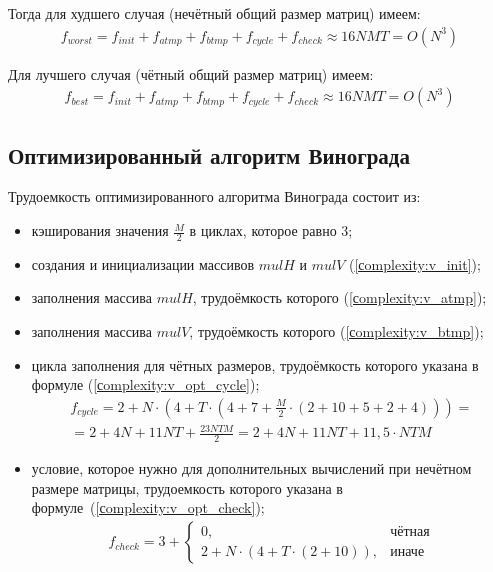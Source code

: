 Тогда для худшего случая (нечётный общий размер матриц) имеем:
\begin{equation}
	\label{сomplexity:vinograd_worst}
	\begin{gathered}
		f_{worst} = f_{init} + f_{atmp} + f_{btmp} + f_{cycle} + f_{check} \approx 16NMT = O(N^3)
	\end{gathered}
\end{equation}

Для лучшего случая (чётный общий размер матриц) имеем:
\begin{equation}
	\label{сomplexity:vinograd_best}
	\begin{gathered}
		f_{best} = f_{init} + f_{atmp} + f_{btmp} + f_{cycle} + f_{check} \approx 16NMT = O(N^3)
	\end{gathered}
\end{equation}

\subsection{Оптимизированный алгоритм Винограда}

Трудоемкость оптимизированного алгоритма Винограда состоит из:
\begin{itemize}[label=---]
	\item кэширования значения $\frac{M}{2}$ в циклах, которое равно 3;
	\item создания и инициализации массивов $mulH$ и $mulV$ (\ref{сomplexity:v_init});
	\item заполнения массива $mulH$, трудоёмкость которого (\ref{сomplexity:v_atmp});
	\item заполнения массива $mulV$, трудоёмкость которого (\ref{сomplexity:v_btmp});
	\clearpage
	\item цикла заполнения для чётных размеров, трудоёмкость которого указана в формуле (\ref{сomplexity:v_opt_cycle});
	\begin{equation}
		\label{сomplexity:v_opt_cycle}
		\begin{aligned}
			f_{cycle} = 2 + N \cdot (4 + T \cdot (4 + 7 + \frac{M}{2} \cdot (2 + 10 + 5 + 2 + 4))) = \\
			= 2 + 4N + 11NT + \frac{23NTM}{2}  = 2 + 4N + 11NT + 11,5 \cdot NTM 
		\end{aligned}
	\end{equation}
	\item условие, которое нужно для дополнительных вычислений при нечётном размере матрицы, трудоемкость которого указана в формуле~(\ref{сomplexity:v_opt_check});
	\begin{equation}
		\label{сomplexity:v_opt_check}
		\begin{aligned}
			f_{check} = 3 + 
			\begin{cases}
				0, & \text{чётная} \\
				2 + N \cdot (4 + T \cdot (2 + 10)), & \text{иначе}
			\end{cases}
		\end{aligned}  
	\end{equation}
\end{itemize}

